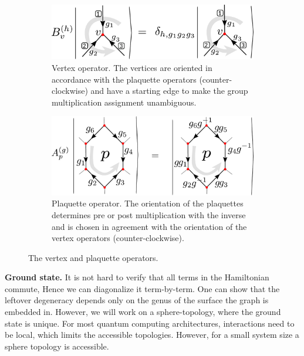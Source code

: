 \documentclass[two column]{article}
\begin{document}
\begin{figure}
    \centering
    \begin{subfigure}[b]{0.45\textwidth}
        \centering
        \includegraphics[width= \linewidth]{Figures/B_ops.pdf}
        \caption{Vertex operator. The vertices are oriented in accordance with the plaquette operators (counter-clockwise) and have a starting edge to make the group multiplication assignment unambiguous.}
        \label{eqn:Bs_def}
    \end{subfigure}\hfill
    \begin{subfigure}[b]{0.45\textwidth}
        \centering
        \includegraphics[width = \linewidth]{Figures/A_ops.pdf}
        \caption{Plaquette operator. The orientation of the plaquettes determines pre or post multiplication with the inverse and is chosen in agreement with the orientation of the vertex operators (counter-clockwise).}
        \label{eqn:As_def}
    \end{subfigure}\hfill
    \caption{The vertex and plaquette operators.}
    \label{fig:vertex_ops}
\end{figure}

\textbf{Ground state.}
It is not hard to verify that all terms in the Hamiltonian commute, Hence we can diagonalize it term-by-term. One can show that the leftover degeneracy depends only on the genus of the surface the graph is embedded in\cite{Kitaev_2003, cui2018topological}. However, we will work on a sphere-topology, where the ground state is unique. For most quantum computing architectures, interactions need to be local, which limits the accessible topologies. However, for a small system size a sphere topology is accessible.
\end{document}
